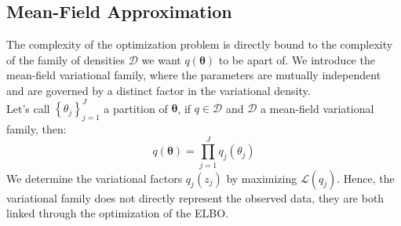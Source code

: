 \documentclass{article}
\begin{document}
\subsection{Mean-Field Approximation}
The complexity of the optimization problem is directly bound to the complexity of the family of densities $\mathcal{D}$ we want $q(\boldsymbol{\theta})$ to be apart of. We introduce the mean-field variational family, where the parameters are mutually independent and are governed by a distinct factor in the variational density.\\
\newline
Let's call $\left\lbrace \theta_j\right\rbrace_{j=1}^J$ a partition of $\boldsymbol{\theta}$, if $q \in \mathcal{D}$ and $\mathcal{D}$ a mean-field variational family, then:
\begin{equation*}
q(\boldsymbol{\theta}) = \prod_{j=1}^J q_j(\theta_j)
\end{equation*}
We determine the variational factors $q_j(z_j)$ by maximizing $\mathcal{L}(q_j)$. Hence, the variational family does not directly represent the observed data, they are both linked through the optimization of the \small{ELBO}.
\newpage
\end{document}
